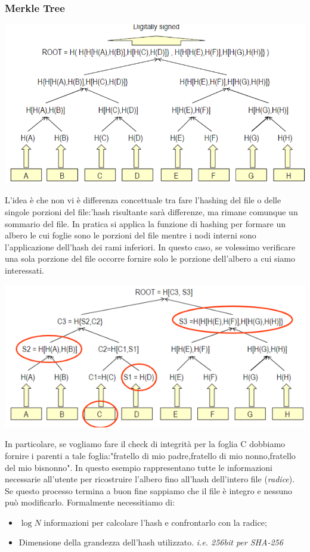 \documentclass{book}
\theoremstyle{remark}
\begin{document}
\subsubsection{Merkle Tree}
\begin{center}
	\includegraphics[scale=0.6]{2021-12-09-15-53-01.png}
\end{center}
L'idea è che non vi è differenza concettuale tra fare l'hashing del file o delle singole porzioni del file:\@l'hash risultante sarà differenze, ma rimane comunque un sommario del file\@.\newline
In pratica si applica la funzione di hashing per formare un albero le cui foglie sono le porzioni del file mentre i nodi interni sono l'applicazione dell'hash dei rami inferiori\@. In questo caso, se volessimo verificare una sola porzione del file occorre fornire solo le porzione dell'albero a cui siamo interessati\@.
\begin{center}
	\includegraphics[scale=0.6]{2021-12-09-15-56-15.png}
\end{center}
In particolare, se vogliamo fare il check di integrità per la foglia C dobbiamo fornire i parenti a tale foglia:\@"fratello di mio padre,fratello di mio nonno,fratello del mio bisnonno"\@. In questo esempio rappresentano tutte le informazioni necessarie all'utente per ricostruire l'albero fino all'hash dell'intero file (\emph{radice})\@. Se questo processo termina a buon fine sappiamo che il file è integro e nessuno può modificarlo\@. Formalmente necessitiamo di:\begin{itemize}
	\item \(\log{N}\) informazioni per calcolare l'hash e confrontarlo con la radice;\@
	\item Dimensione della grandezza dell'hash utilizzato\@. \emph{i\@.e\@. 256bit per SHA-256}
\end{itemize}
\end{document}
